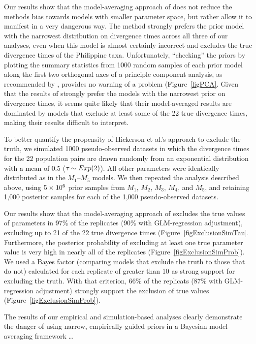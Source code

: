 \documentclass[letterpaper,12pt]{article}
\begin{document}
\begin{linenumbers}
Our results show that the model-averaging approach of \citet{Hickerson2013}
does not reduce the methods bias towards models with smaller parameter space,
but rather allow it to manifest in a very dangerous way.
The method strongly prefers the prior model with the narrowest distribution on
divergence times across all three of our analyses, even when this model is
almost certainly incorrect and excludes the true divergence times of the
Philippine taxa.
Unfortunately, ``checking'' the priors by plotting the summary statistics from
1000 random samples of each prior model along the first two orthogonal axes of
a principle component analysis, as recommended by \citet{Hickerson2013},
provides no warning of a problem (Figure~\ref{figPCA}.
Given that the results of \citet{Hickerson2013} strongly prefer the models with
the narrowest prior on divergence times, it seems quite likely that their
model-averaged results are dominated by models that exclude at least some of
the 22 true divergence times, making their results difficult to interpret.

To better quantify the propensity of Hickerson et al.'s
\citeyear{Hickerson2013} approach to exclude the truth, we simulated
1000 pseudo-observed datasets in which the divergence times for the
22 population pairs are drawn randomly from an exponential distribution
with a mean of 0.5 ($\tau_{} \sim Exp(2)$). All other parameters were
identically distributed as in the $M_1$--$M_5$ models.
We then repeated the analysis described above, using $5\times 10^{6}$ prior samples from
$M_1$, $M_2$, $M_3$, $M_4$, and $M_5$, and retaining 1,000 posterior samples
for each of the 1,000 pseudo-observed datasets.

Our results show that the model-averaging approach of \citet{Hickerson2013}
excludes the true values of parameters in 97\% of the replicates (90\% with
GLM-regression adjustment), excluding up to 21 of the 22 true divergence times
(Figure~\ref{figExclusionSimTau}.
Furthermore, the posterior probability of excluding at least one true parameter
value is very high in nearly all of the replicates
(Figure~\ref{figExclusionSimProb}).
We used a Bayes factor (comparing models that exclude the truth to those that
do not) calculated for each replicate of greater than 10 as strong support for
excluding the truth.
With that criterion, 66\% of the replicats (87\% with GLM-regression adjustment)
strongly support the exclusion of true values (Figure~\ref{figExclusionSimProb}).

The results of our empirical and simulation-based analyses clearly demonstrate
the danger of using narrow, empirically guided priors in a Bayesian
model-averaging framework \ldots


\end{linenumbers}
\end{document}
